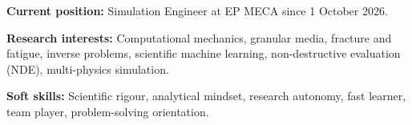 \documentclass[11pt, a4paper]{awesome-cv}
\begin{document}
\begin{cvitems}
  \item \textbf{Current position:} Simulation Engineer at EP MECA since 1 October 2026.
  \item \textbf{Research interests:} Computational mechanics, granular media, fracture and fatigue, inverse problems, scientific machine learning, non-destructive evaluation (NDE), multi-physics simulation.
  \item \textbf{Soft skills:} Scientific rigour, analytical mindset, research autonomy, fast learner, team player, problem-solving orientation.
\end{cvitems}
\end{document}

